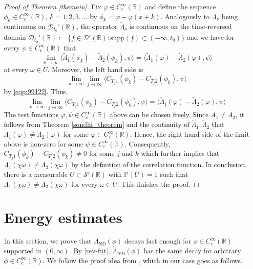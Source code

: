 \documentclass[10pt,a4paper]{article}
\theoremstyle{plain}
\theoremstyle{definition}
\theoremstyle{remark}
\numberwithin{equation}{section}
\newcommand{\R}{\mathbb{R}}
\newcommand{\ND}{\Lambda_{\text{ND}}}
\begin{document}
\begin{proof}[Proof of Theorem \ref{themain}]
Fix $\varphi \in C^\infty_c(\R)$ and  
define the sequence $\phi_k \in C^\infty_c(\R)$, $k=1,2,3,\dots$ 
by $\phi_k = \varphi - \varphi (x + k)$. 
Analogously to $\Lambda_\nu $ being continuous on $\mathcal{D}_{t_0}' (\R)$, the operator $ \tilde\Lambda_{\nu}$
is continuous on the time-reversed domain $\tilde{\mathcal{D}}_{t_0}' (\R) :=  \{ f \in \mathcal{D}'(\R) :   \text{supp} (f) \subset (-\infty, t_0)  \} $ and we have for every $\psi \in C_c^\infty(\R)$ that 
\[
 \lim_{k \to \infty }   \langle \tilde\Lambda_{1} (\phi_k )-\tilde\Lambda_{2} (\phi_k ), \psi \rangle =   \langle \tilde\Lambda_{1} (\varphi )-\tilde\Lambda_{2} (\varphi ), \psi \rangle
\]
at every  $\omega \in U$. Moreover, the left hand side is 
\[
\lim_{k \to \infty }  \lim_{j \to \infty } \langle C_{T_{j}1}(\phi_k)-C_{T_{j}2}(\phi_k)  , \psi \rangle  
\]
by \eqref{eqp:99122}.  
Thus, 
\[
\lim_{k \to \infty }  \lim_{j \to \infty } \langle C_{T_{j}1}(\phi_k)-C_{T_{j}2}(\phi_k)  , \psi \rangle  =   \langle \tilde\Lambda_{1} (\varphi )-\tilde\Lambda_{2} (\varphi ), \psi \rangle
\]
The test functions $\varphi , \psi \in C^\infty_c( \R)$ above can be chosen freely. 
%
Since  $A_1 \neq A_2$, it follows from Theorem \ref{sondhi_theorem} and the continuity of $\tilde\Lambda_{1},\tilde\Lambda_{2}$ that $\tilde\Lambda_{1}( \varphi ) \neq \tilde\Lambda_{2} (\varphi  )$ for some $\varphi \in C^\infty_c (\R)$. 
Hence, the right hand side of the limit above is non-zero for some $\psi \in C_c^\infty(\R)$. 
Consequently,  $C_{T_j1}(\phi_k)-C_{T_j2}(\phi_k) \neq 0 $ for some $j$ and $k$ which further implies that $\Lambda_{1} (\chi \omega)  \neq \Lambda_{2} (\chi \omega) $ by the definition of the correlation function. 
In conclusion, there is a measurable $U \subset \mathcal{S}'(\R)$ with $\mathbb{P} (U) = 1$ such that $\Lambda_{1} (\chi \omega)  \neq \Lambda_{2} (\chi \omega) $ for every $\omega \in U$. 
This finishes the proof. 
\end{proof}



 
\appendix
\appendixpage




\section{Energy estimates}\label{energy-estimate-sec}

In this section, we prove that $\ND ( \phi )$ decays fast enough for $\phi \in C^\infty_c(\R)$ supported in $(0,\infty)$. 
By \eqref{rev-fut}, $\tilde\Lambda_{ND} ( \phi)$ has the same decay for arbitrary $\phi \in C^\infty_c(\R)$. 
We follow the proof idea from \cite{arnold22_expon_time_decay_one_dimen}, which in our case goes as follows.
\end{document}
